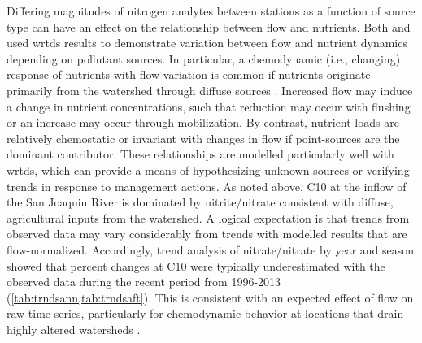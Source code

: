 \documentclass[letterpaper,12pt,oneside]{article}\usepackage[]{graphicx}\usepackage[]{color}
\begin{document}
Differing magnitudes of nitrogen analytes between stations as a function of source type can have an effect on the relationship between flow and nutrients.  Both \citet{Hirsch10} and \citet{Beck15} used \ac{wrtds} results to demonstrate variation between flow and nutrient dynamics depending on pollutant sources.  In particular, a chemodynamic (i.e., changing) response of nutrients with flow variation is common if nutrients originate primarily from the watershed through diffuse sources \citep{Thompson11,Wan17}.  Increased flow may induce a change in nutrient concentrations, such that reduction may occur with flushing or an increase may occur through mobilization.  By contrast, nutrient loads are relatively chemostatic or invariant with changes in flow if point-sources are the dominant contributor.  These relationships are modelled particularly well with \ac{wrtds}, which can provide a means of hypothesizing unknown sources or verifying trends in response to management actions.  As noted above, C10 at the inflow of the San Joaquin River is dominated by nitrite/nitrate consistent with diffuse, agricultural inputs from the watershed.  A logical expectation is that trends from observed data may vary considerably from trends with modelled results that are flow-normalized.  Accordingly, trend analysis of nitrate/nitrate by year and season showed that percent changes at C10 were typically underestimated with the observed data during the recent period from 1996-2013 (\cref{tab:trndsann,tab:trndsaft}).  This is consistent with an expected effect of flow on raw time series, particularly for chemodynamic behavior at locations that drain highly altered watersheds \citep{Wan17}.
\end{document}
